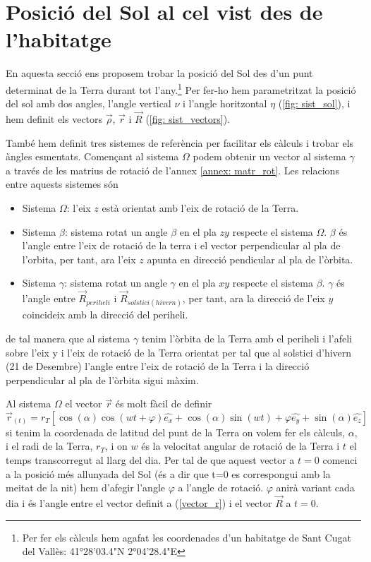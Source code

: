 \documentclass[11pt]{article}
\begin{document}
\section{Posició del Sol al cel vist des de l'habitatge} 
En aquesta secció ens proposem trobar la posició del Sol des d'un punt determinat de la Terra durant tot l'any.\footnote{\label{nota: habitatge}Per fer els càlculs hem agafat les coordenades d'un habitatge de Sant Cugat del Vallès: 41°28'03.4"N 2°04'28.4"E} Per fer-ho hem parametritzat la posició del sol amb dos angles, l'angle vertical $\nu$ i l'angle horitzontal $\eta$ (\ref{fig: sist_sol}), i hem definit els vectors $\vec{\rho}$, $\vec{r}$ i $\vec{R}$ (\ref{fig: sist_vectors}).

També hem definit tres sistemes de referència per facilitar els càlculs i trobar els àngles esmentats. Començant al sistema $\Omega$ podem obtenir un vector al sistema $\gamma$ a través de les matrius de rotació de l'annex \ref{annex: matr_rot}. Les relacions entre aquests sistemes són
\begin{itemize}
    \item Sistema $\Omega$: l'eix $z$ està orientat amb l'eix de rotació de la Terra.
    \item Sistema $\beta$: sistema rotat un angle $\beta$ en el pla $zy$ respecte el sistema $\Omega$. $\beta$ és l'angle entre l'eix de rotació de la terra i el vector perpendicular al pla de l'orbita, per tant, ara l'eix $z$ apunta en direcció pendicular al pla de l'òrbita.
    \item Sistema $\gamma$: sistema rotat un angle $\gamma$ en el pla $xy$ respecte el sistema $\beta$. $\gamma$ és l'angle entre $\vec{R}_{periheli}$ i $\vec{R}_{solstici(hivern)}$, per tant, ara la direcció de l'eix $y$ coincideix amb la direcció del periheli.
\end{itemize}
de tal manera que al sistema $\gamma$ tenim l'òrbita de la Terra amb el periheli i l'afeli sobre l'eix y i l'eix de rotació de la Terra orientat per tal que al solstici d'hivern (21 de Desembre) l'angle entre l'eix de rotació de la Terra i la direcció perpendicular al pla de l'òrbita sigui màxim.

Al sistema $\Omega$ el vector $\vec{r}$ és molt fàcil de definir 
\begin{equation}
    \vec{r}_{(t)}=r_T[\cos(\alpha)\cos(wt+\varphi)\hat{e_x}+\cos(\alpha)\sin(wt)+\varphi\hat{e_y}+\sin(\alpha)\hat{e_z}]
    \label{vector_r}
\end{equation}
si tenim la coordenada de latitud del punt de la Terra on volem fer els càlculs, $\alpha$, i el radi de la Terra, $r_T$, i on $w$ és la velocitat angular de rotació de la Terra i $t$ el temps transcorregut al llarg del dia.
Per tal de que aquest vector a $t=0$ comenci a la posició més allunyada del Sol (és a dir que t=0 es correspongui amb la meitat de la nit) hem d'afegir l'angle $\varphi$ a l'angle de rotació. $\varphi$ anirà variant cada dia i és l'angle entre el vector definit a (\ref{vector_r}) i el vector $\vec{R}$ a $t=0$.
\end{document}
